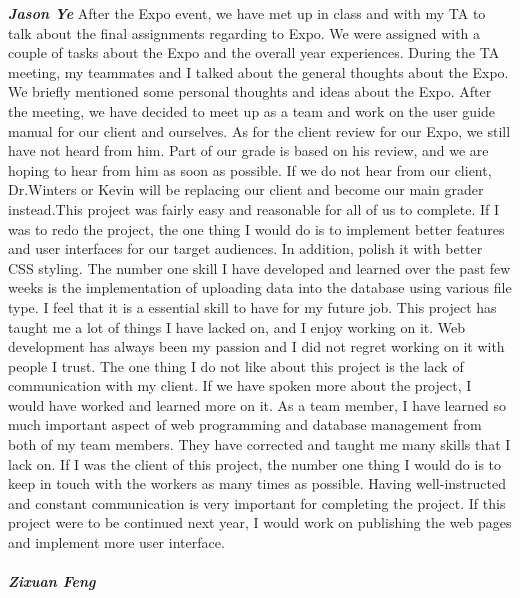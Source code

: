 \documentclass[onecolumn, draftclsnofoot,10pt, compsoc]{IEEEtran}
\begin{document}
\textbf{\textit{Jason Ye}}
After the Expo event, we have met up in class and with my TA to talk about the final assignments regarding to Expo. We were assigned with a couple of tasks about the Expo and the overall year experiences. During the TA meeting, my teammates and I talked about the general thoughts about the Expo. We briefly mentioned some personal thoughts and ideas about the Expo. After the meeting, we have decided to meet up as a team and work on the user guide manual for our client and ourselves. As for the client review for our Expo, we still have not heard from him. Part of our grade is based on his review, and we are hoping to hear from him as soon as possible. If we do not hear from our client, Dr.Winters or Kevin will be replacing our client and become our main grader instead.This project was fairly easy and reasonable for all of us to complete. If I was to redo the project, the one thing I would do is to implement better features and user interfaces for our target audiences. In addition, polish it with better CSS styling. The number one skill I have developed and learned over the past few weeks is the implementation of uploading data into the database using various file type. I feel that it is a essential skill to have for my future job. This project has taught me a lot of things I have lacked on, and I enjoy working on it. Web development has always been my passion and I did not regret working on it with people I trust. The one thing I do not like about this project is the lack of communication with my client. If we have spoken more about the project, I would have worked and learned more on it. As a team member, I have learned so much important aspect of web programming and database management from both of my team members. They have corrected and taught me many skills that I lack on. If I was the client of this project, the number one thing I would do is to keep in touch with the workers as many times as possible. Having well-instructed and constant communication is very important for completing the project. If this project were to be continued next year, I would work on publishing the web pages and implement more user interface.\\ \\
\textbf{\textit{Zixuan Feng}}
\end{document}
